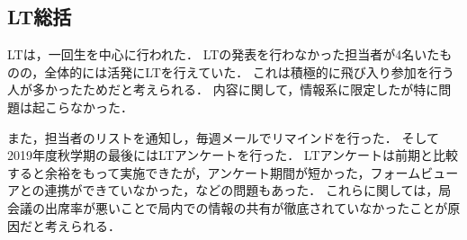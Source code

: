 \subsection*{LT総括}

LTは，一回生を中心に行われた．
LTの発表を行わなかった担当者が4名いたものの，全体的には活発にLTを行えていた．
これは積極的に飛び入り参加を行う人が多かったためだと考えられる．
内容に関して，情報系に限定したが特に問題は起こらなかった．

また，担当者のリストを通知し，毎週メールでリマインドを行った．
そして2019年度秋学期の最後にはLTアンケートを行った．
LTアンケートは前期と比較すると余裕をもって実施できたが，アンケート期間が短かった，フォームビューアとの連携ができていなかった，などの問題もあった．
これらに関しては，局会議の出席率が悪いことで局内での情報の共有が徹底されていなかったことが原因だと考えられる．
